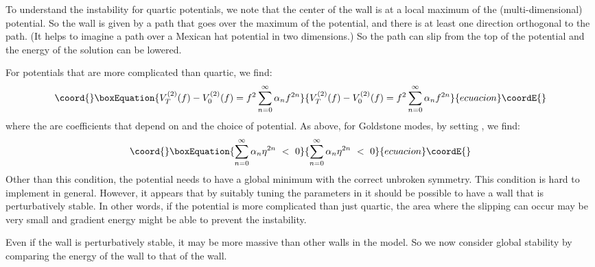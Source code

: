 \documentclass[a4paper,prd,nofootinbib,twocolumn,showpacs]{revtex4}
\begin{document}
To understand the instability for quartic potentials,
we note that the center of the \coordHE{} wall is at a local
maximum of the (multi-dimensional) potential. So the
wall is given by a path that goes over the maximum of
the potential, and there is at least one direction
orthogonal to the path. (It helps to imagine a path
over a Mexican hat potential in two dimensions.) So
the path can slip from the top of the potential and
the energy of the solution can be lowered. 

{}For potentials that are more complicated than quartic,
we find:
\begin{equation}\coord{}\boxEquation{
V^{(2)}_T(f) - V^{(2)}_0 (f) =  
              f^2 \sum_{n=0}^\infty \alpha_n f^{2n}
\label{V2-V2generalV}
}{
V^{(2)}_T(f) - V^{(2)}_0 (f) =  
              f^2 \sum_{n=0}^\infty \alpha_n f^{2n}
}{ecuacion}\coordE{}\end{equation}
where the \coordHE{} are coefficients that depend on
\coordHE{} and the choice of potential. As above, for Goldstone
modes, by setting \coordHE{}, we find:
\begin{equation}\coord{}\boxEquation{
\sum_{n=0}^\infty \alpha_n \eta^{2n} ~ < ~ 0
\label{generalcondition}
}{
\sum_{n=0}^\infty \alpha_n \eta^{2n} ~ < ~ 0
}{ecuacion}\coordE{}\end{equation}
Other than this condition, the potential needs to have
a global minimum with the correct unbroken symmetry.
This condition is hard to implement in general. However,
it appears that by suitably tuning the parameters in
\coordHE{} it should be possible to have a \coordHE{} wall
that is perturbatively stable. In other words, if
the potential is more complicated than just quartic,
the area where the slipping can occur may be very
small and gradient energy might be able to prevent 
the instability.

Even if the \coordHE{} wall is perturbatively stable, it may
be more massive than other walls in the model. So we now
consider global stability by comparing the energy of
the \coordHE{} wall to that of the \coordHE{} wall.
\end{document}
